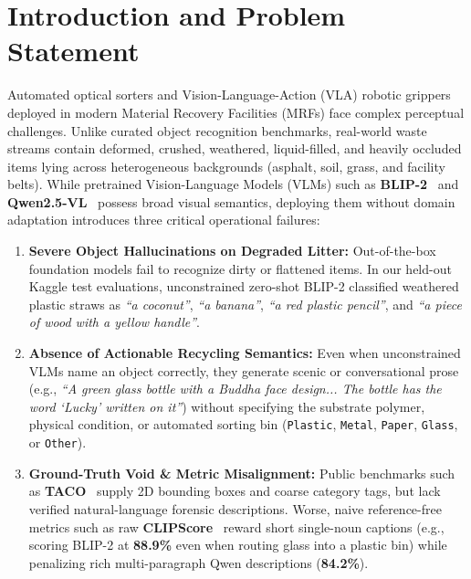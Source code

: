\documentclass[11pt,a4paper]{article}
\begin{document}
\setcounter{tocdepth}{1}
\tableofcontents
\newpage

\section{Introduction and Problem Statement}

Automated optical sorters and Vision-Language-Action (VLA) robotic grippers deployed in modern Material Recovery Facilities (MRFs) face complex perceptual challenges. Unlike curated object recognition benchmarks, real-world waste streams contain deformed, crushed, weathered, liquid-filled, and heavily occluded items lying across heterogeneous backgrounds (asphalt, soil, grass, and facility belts). While pretrained Vision-Language Models (VLMs) such as \textbf{BLIP-2}~\cite{li2023blip2} and \textbf{Qwen2.5-VL}~\cite{qwen25vl} possess broad visual semantics, deploying them without domain adaptation introduces three critical operational failures:

\begin{enumerate}[leftmargin=1.5em]
    \item \textbf{Severe Object Hallucinations on Degraded Litter:} Out-of-the-box foundation models fail to recognize dirty or flattened items. In our held-out Kaggle test evaluations, unconstrained zero-shot BLIP-2 classified weathered plastic straws as \textit{``a coconut''}, \textit{``a banana''}, \textit{``a red plastic pencil''}, and \textit{``a piece of wood with a yellow handle''}.
    \item \textbf{Absence of Actionable Recycling Semantics:} Even when unconstrained VLMs name an object correctly, they generate scenic or conversational prose (e.g., \textit{``A green glass bottle with a Buddha face design... The bottle has the word `Lucky' written on it''}) without specifying the substrate polymer, physical condition, or automated sorting bin (\texttt{Plastic}, \texttt{Metal}, \texttt{Paper}, \texttt{Glass}, or \texttt{Other}).
    \item \textbf{Ground-Truth Void \& Metric Misalignment:} Public benchmarks such as \textbf{TACO}~\cite{proenca2020taco} supply 2D bounding boxes and coarse category tags, but lack verified natural-language forensic descriptions. Worse, naive reference-free metrics such as raw \textbf{CLIPScore}~\cite{hessel2021clipscore} reward short single-noun captions (e.g., scoring BLIP-2 at \textbf{88.9\%} even when routing glass into a plastic bin) while penalizing rich multi-paragraph Qwen descriptions (\textbf{84.2\%}).
\end{enumerate}
\end{document}
